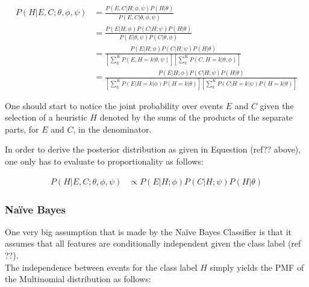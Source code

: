 \begin{equation}
    \begin{split}
        P(H \vert E, C;  \theta, \phi, \psi)
        &= \frac{
            P(E, C \vert H;  \phi, \psi)  P(H \vert \theta)
            }{
            P(E, C | \theta, \phi, \psi)
        } \\		
        &= \frac{
            P(E \vert H;  \phi)  P(C \vert H;  \psi) P(H \vert \theta)
            }{
            P(E | \theta, \psi) P(C | \theta, \phi)
        } \\
        &= \frac{
            P(E \vert H;  \phi)  P(C \vert H;  \psi) P(H \vert \theta)
            }{
            \left[ \sum_{k}^{K} P(E, H=k | \theta, \psi) \right] \left[ \sum_{k}^{K}  P(C, H=k | \theta, \phi) \right]
        } \\
        &= \frac{
            P(E \vert H;  \phi)  P(C \vert H;  \psi) P(H \vert \theta)
            }{
            \left[ \sum_{k}^{K} P(E | H=k | \phi) P(H=k \vert \theta) \right] \left[ \sum_{k}^{K} P(C | H=k | \psi) P(H=k \vert \theta) \right]
        }
    \end{split}
\end{equation}

One should start to notice the joint probability over events $E$ and $C$ given the selection of a heuristic $H$ denoted by the sums of the products of the separate parts, for $E$ and $C$, in the denominator.

In order to derive the posterior distribution as given in Equestion (ref?? above), one only has to evaluate to proportionality as follows:

\begin{equation}
    \begin{split}
        P(H \vert E, C;  \theta, \phi, \psi) &\propto P(E \vert H;  \phi)  P(C \vert H;  \psi) P(H \vert \theta)
    \end{split}
\end{equation}


\subsubsection{Naïve Bayes}
\label{sec:bhh:selection_mechanism:naive_bayes}

One very big assumption that is made by the Naïve Bayes Classifier is that it
assumes that all features are conditionally independent given the class label
(ref ??). \\
The independence between events for the class label $H$ simply yields the PMF of the Multinomial distribution as follows:


